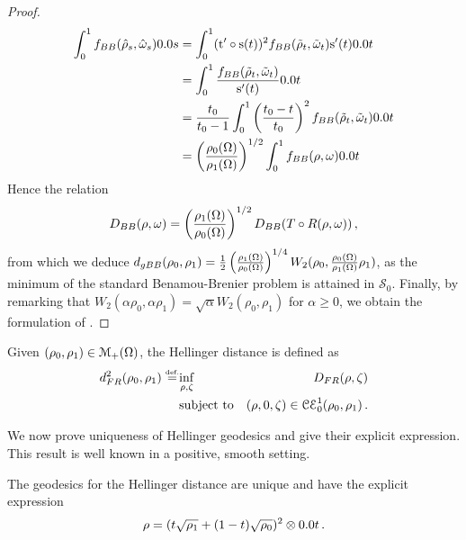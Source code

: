 \begin{proof}
\begin{align*}
\int_0^1 f_{BB}(\hat{\rho}_s, \hat{\M}_s) \d s
&= \int_0^1 (\t' \circ \s (t))^2 f_{BB}(\tilde{\rho}_t, \tilde{\M}_t) \s'(t) \d t \\
&= \int_0^1 \frac{f_{BB}(\tilde{\rho}_t, \tilde{\M}_t)}{\s'(t)} \d t \\
&= \frac{t_0}{t_0-1} \int_0^1 \left(\frac{t_0-t}{t_0} \right)^2 f_{BB}(\tilde{\rho}_t, \tilde{\M}_t) \d t \\
&= \left(\frac{\rho_0(\Om)}{\rho_1(\Om)}\right)^{1/2} \int_0^1 f_{BB}(\rho,\M) \d t
\end{align*}
Hence the relation
\[
D_{BB}(\rho,\omega) = \left(\frac{\rho_1(\Omega)}{\rho_0(\Omega)}\right)^{1/2} D_{BB}(T \circ R (\rho,\omega))   \, ,
\]
from which we deduce $d_{gBB}(\rho_0,\rho_1) = \frac12 \left(\frac{\rho_1(\Omega)}{\rho_0(\Omega)}\right)^{1/4} W_2(\rho_0,\frac{\rho_0(\Omega)}{\rho_1(\Omega)} \rho_1)$, as the minimum of the standard Benamou-Brenier problem is attained in $\mathcal{S}_0$. Finally, by remarking that $W_2(\alpha \rho_0, \alpha \rho_1) = \sqrt{\alpha}W_2(\rho_0,\rho_1)$ for $\alpha\geq0$, we obtain the formulation of .
\end{proof}


\begin{definition}
Given $(\rho_0,\rho_1) \in \mathcal{M}_+(\Omega)$, the Hellinger distance is defined as
\begin{eqnarray*}
d_{FR}^2(\rho_0,\rho_1) \stackrel{\mbox{\upshape\tiny def.}}{=} & \underset{\rho,\zeta}{\inf} & D_{FR} (\rho,\zeta) \\
&\text{subject to} & (\rho,0,\zeta) \in \mathcal{CE}_0^1(\rho_0,\rho_1) \, .
\end{eqnarray*}
\end{definition}

We now prove uniqueness of Hellinger geodesics and give their explicit expression. This result is well known in a positive, smooth setting.
\begin{theorem}
The geodesics for the Hellinger distance are unique and have the explicit expression 
\begin{equation}
\label{FR geodesic}
\rho = (t\sqrt{\rho_1} + (1-t)\sqrt{\rho_0})^2 \otimes  \d t\, .
\end{equation}
\end{theorem}

